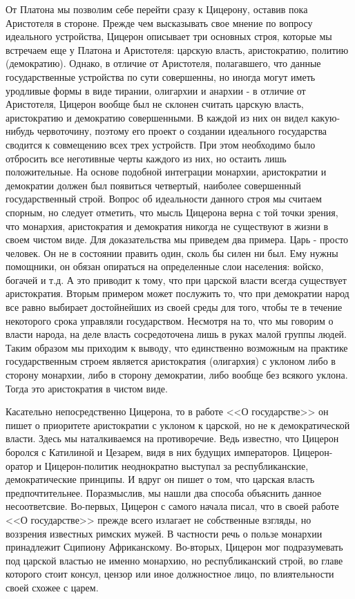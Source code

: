	От Платона мы позволим себе перейти сразу к Цицерону, оставив пока 
	Аристотеля в стороне. Прежде чем высказывать свое мнение по вопросу 
	идеального устройства, Цицерон описывает три основных строя, которые 
	мы встречаем еще у Платона и Аристотеля: царскую власть, аристократию, 
	политию (демократию). Однако, в отличие от Аристотеля, полагавшего, что 
	данные государственные устройства по сути совершенны, но иногда могут 
	иметь уродливые формы в виде тирании, олигархии и анархии - в отличие от 
	Аристотеля, Цицерон вообще был не склонен считать царскую власть, 
	аристократию и демократию совершенными. В каждой из них он видел 
	какую-нибудь червоточину, поэтому его проект о создании идеального 
	государства сводится к совмещению всех трех устройств. При этом необходимо 
	было отбросить все неготивные черты каждого из них, но остаить лишь 
	положительные. На основе подобной интеграции монархии, аристократии 
	и демократии должен был появиться четвертый, наиболее совершенный 
	государственный строй. Вопрос об идеальности данного строя мы считаем 
	спорным, но следует отметить, что мысль Цицерона верна с той точки зрения, 
	что монархия, аристократия и демократия никогда не существуют в жизни в 
	своем чистом виде. Для доказательства мы приведем два примера. 
	Царь - просто человек. Он не в состоянии править один, сколь бы силен ни был. 
	Ему нужны помощники, он обязан опираться на определенные слои населения: 
	войско, богачей и т.д. А это приводит к тому, что при царской власти 
	всегда существует аристократия. Вторым примером может послужить то, что 
	при демократии народ все равно выбирает достойнейших из своей среды для 
	того, чтобы те в течение некоторого срока управляли государством. Несмотря 
	на то, что мы говорим о власти народа, на деле власть сосредоточена лишь в 
	руках малой группы людей. Таким образом мы приходим к выводу, что 
	единственно возможным на практике государственным строем является 
	аристократия (олигархия) с уклоном либо в сторону монархии, либо в сторону 
	демократии, либо вообще без всякого уклона. Тогда это аристократия в 
	чистом виде.

	Касательно непосредственно Цицерона, то в работе <<О государстве>> он пишет 
	о приоритете аристократии с уклоном к царской, но не к демократической власти. 
	Здесь мы наталкиваемся на противоречие. Ведь известно, что Цицерон боролся с
	Катилиной и Цезарем, видя в них будущих императоров. Цицерон-оратор и 
	Цицерон-политик неоднократно выступал за республиканские, демократические 
	принципы. И вдруг он пишет о том, что царская власть предпочтительнее. 
	Поразмыслив, мы нашли два способа объяснить данное несоответсвие. Во-первых, 
	Цицерон с самого начала писал, что в своей работе <<О государстве>> прежде 
	всего излагает не собственные взгляды, но воззрения известных римских мужей. 
	В частности речь о пользе монархии принадлежит Сципиону Африканскому. 
	Во-вторых, Цицерон мог подразумевать под царской властью не именно монархию, 
	но республиканский строй, во главе которого стоит консул, цензор или иное 
	должностное лицо, по влиятельности своей схожее с царем.

